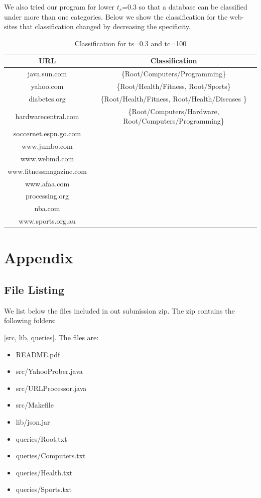 \documentclass[11pt]{article}
\begin{document}
We also tried our program for lower $t_s$=0.3 so that a database can be classified under more than one categories. Below we show the classification for the web-sites that classification changed
by decreasing the specificity.
\begin{table}
\begin{tabular}{|c|c|}
\hline
\textbf{URL} & \textbf{Classification}\\
\hline
java.sun.com &  \{Root/Computers/Programming\} \\
\hline
yahoo.com& \{Root/Health/Fitness, Root/Sports\}\\
\hline
diabetes.org& \{Root/Health/Fitness, 
										Root/Health/Diseases \}\\
\hline
hardwarecentral.com&  \{Root/Computers/Hardware, Root/Computers/Programming\}\\
\hline
soccernet.espn.go.com &  \\
\hline
www.jumbo.com & \\
\hline
www.webmd.com & \\
\hline
www.fitnessmagazine.com & \\
\hline
www.afaa.com & \\
\hline
processing.org & \\
\hline
nba.com & \\
\hline
www.sports.org.au &\\
\hline
\end{tabular}
\caption{Classification for ts=0.3 and tc=100}
\label{Res2}
\end{table}

\section* {Appendix}

\subsection* {File Listing}

We list below the files included in out submission zip. The zip contains the following folders:

[src, lib, queries].
The files are:
\begin{itemize}
\item README.pdf
\item src/YahooProber.java
\item src/URLProcessor.java
\item src/Makefile
\item lib/json.jar
\item queries/Root.txt
\item queries/Computers.txt
\item queries/Health.txt
\item queries/Sports.txt
\end{itemize}
\end{document}
